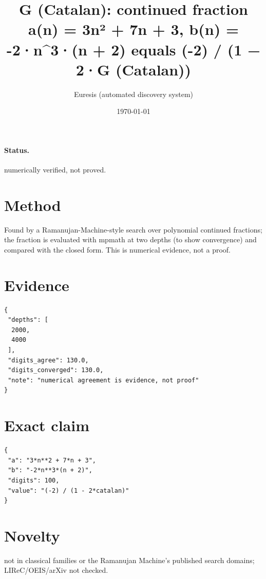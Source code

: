 \documentclass[11pt]{article}
\title{G (Catalan): continued fraction a(n) = 3n² + 7n + 3, b(n) = -2·n\^{}3·(n + 2) equals (-2) / (1 − 2·G (Catalan))}
\author{Euresis (automated discovery system)}
\date{\today}
\begin{document}
\maketitle
\paragraph{Status.} numerically verified, not proved.
\section{Method}
Found by a Ramanujan-Machine-style search over polynomial continued fractions; the fraction is evaluated with mpmath at two depths (to show convergence) and compared with the closed form. This is numerical evidence, not a proof.
\section{Evidence}
\begin{verbatim}
{
 "depths": [
  2000,
  4000
 ],
 "digits_agree": 130.0,
 "digits_converged": 130.0,
 "note": "numerical agreement is evidence, not proof"
}
\end{verbatim}
\section{Exact claim}
\begin{verbatim}
{
 "a": "3*n**2 + 7*n + 3",
 "b": "-2*n**3*(n + 2)",
 "digits": 100,
 "value": "(-2) / (1 - 2*catalan)"
}
\end{verbatim}
\section{Novelty}
not in classical families or the Ramanujan Machine's published search domains; LIReC/OEIS/arXiv not checked.
\end{document}
